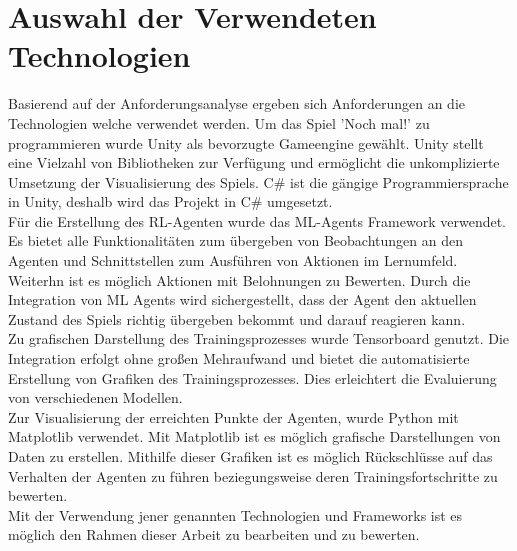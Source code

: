 \section{Auswahl der Verwendeten Technologien}
Basierend auf der Anforderungsanalyse ergeben sich Anforderungen an die Technologien welche verwendet werden. 
Um das Spiel 'Noch mal!' zu programmieren wurde Unity als bevorzugte Gameengine gewählt. Unity stellt eine Vielzahl von Bibliotheken zur Verfügung und ermöglicht die unkomplizierte Umsetzung der Visualisierung des Spiels. C\# ist die gängige Programmiersprache in Unity, deshalb wird das Projekt in C\# umgesetzt. \\
Für die Erstellung des RL-Agenten wurde das ML-Agents Framework verwendet. Es bietet alle Funktionalitäten zum übergeben von Beobachtungen an den Agenten und Schnittstellen zum Ausführen von Aktionen im Lernumfeld. Weiterhn ist es möglich Aktionen mit Belohnungen zu Bewerten. Durch die Integration von ML Agents wird sichergestellt, dass der Agent den aktuellen Zustand des Spiels richtig übergeben bekommt und darauf reagieren kann. \\
Zu grafischen Darstellung des Trainingsprozesses wurde Tensorboard genutzt. Die Integration erfolgt ohne großen Mehraufwand und bietet die automatisierte Erstellung von Grafiken des Trainingsprozesses. Dies erleichtert die Evaluierung von verschiedenen Modellen. \\ Zur Visualisierung der erreichten Punkte der Agenten, wurde Python mit Matplotlib verwendet. Mit Matplotlib ist es möglich grafische Darstellungen von Daten zu erstellen. Mithilfe dieser Grafiken ist es möglich Rückschlüsse auf das Verhalten der Agenten zu führen beziegungsweise deren Trainingsfortschritte zu bewerten. \\
Mit der Verwendung jener genannten Technologien und Frameworks ist es möglich den Rahmen dieser Arbeit zu bearbeiten und zu bewerten.